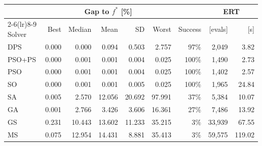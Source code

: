\begin{tabular}{lrrrrrrrr}
\toprule
 & \multicolumn{5}{c}{Gap to $f^*$ [\%]} & & \multicolumn{2}{c}{ERT} \\
\cmidrule(lr){2-6}\cmidrule(lr){8-9}
Solver & Best & Median & Mean & SD & Worst & Success & [evals] & [s]\\
\midrule
DPS & 0.000 & 0.000 & 0.094 & 0.503 & 2.757 & 97\% & 2,049 & 3.82\\
PSO+PS & 0.000 & 0.001 & 0.001 & 0.004 & 0.025 & 100\% & 1,490 & 2.73\\
PSO & 0.000 & 0.001 & 0.001 & 0.004 & 0.025 & 100\% & 1,402 & 2.57\\
SO & 0.000 & 0.001 & 0.001 & 0.005 & 0.025 & 100\% & 1,965 & 24.84\\
SA & 0.005 & 2.570 & 12.056 & 20.692 & 97.991 & 37\% & 5,384 & 10.07\\
GA & 0.001 & 2.766 & 3.426 & 3.606 & 16.361 & 27\% & 7,486 & 13.92\\
GS & 0.231 & 10.443 & 13.602 & 11.233 & 35.215 & 3\% & 33,939 & 67.55\\
MS & 0.075 & 12.954 & 14.431 & 8.881 & 35.413 & 3\% & 59,575 & 119.02\\
\bottomrule
\end{tabular}
